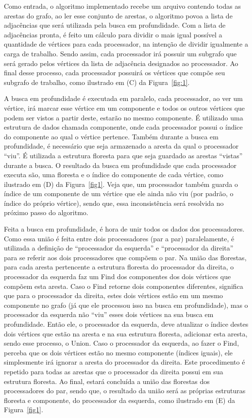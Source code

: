 \documentclass[12pt]{article}
\begin{document}
Como entrada, o algoritmo implementado recebe um arquivo contendo todas as arestas do grafo, ao ler esse conjunto de arestas, o algoritmo povoa a lista de adjacências que será utilizada pela busca em profundidade. Com a lista de adjacências pronta, é feito um cálculo para dividir o mais igual possível a quantidade de vértices para cada processador, na intenção de dividir igualmente a carga de trabalho. Sendo assim, cada processador irá possuir um subgrafo que será gerado pelos vértices da lista de adjacência designados ao processador. Ao final desse processo, cada processador possuirá os vértices que compõe seu subgrafo de trabalho, como ilustrado em (C) da Figura~\ref{fig:1}.

A busca em profundidade é executada em paralelo, cada processador, ao ver um vértice, irá marcar esse vértice em um componente e todos os outros vértices que podem ser vistos a partir deste, estarão no mesmo componente. É utilizado uma estrutura de dados chamada componente, onde cada processador possui o índice do componente ao qual o vértice pertence. Também durante a busca em profundidade, é necessário que seja armazenado a aresta da qual o processador “viu”. É utilizada a estrutura floresta para que seja guardado as arestas “vistas” durante a busca. O resultado da busca em profundidade que cada processador executa são, uma floresta e o índice do componente de cada vértice, como ilustrado em (D) da Figura~\ref{fig1}. Veja que, um processador também guarda o índice de um componente de um vértice que ele ainda não viu (por padrão, o índice do próprio vértice), sendo que, essa inconsistência será resolvida no próximo passo do algoritmo.

Feita a busca em profundidade, é hora de unir todos os dados dos processadores. Como essa união é feita entre dois processadores (par a par) paralelamente, é utilizada a definição de “processador da esquerda” e “processador da direita” para se referir aos dois processadores que compõem o par. Na união das florestas, para cada aresta pertencente a estrutura floresta do processador da direita, o processador da esquerda faz um Find dos componentes dos dois vértices que compõem esta aresta. Caso o Find retorne dois componentes diferentes, significa que para o processador da direita, estes dois vértices estão em um mesmo componente no grafo (já que ele processou isso na busca em profundidade), mas o processador da esquerda não “viu” esses dois vértices na sua busca em profundidade. Então ele, o processador da esquerda, deve atualizar o índice destes dois vértices que estão na aresta e na sua estrutura floresta, adicionar esta aresta, sendo esse processo, o Union. Caso o processador da esquerda, ao fazer o Find, perceba que os dois vértices estão no mesmo componente (índices iguais), ele simplesmente irá ignorar a aresta do processador da direita. Este procedimento é repetido para todas as arestas que o processador da direita possui em sua estrutura floresta. Ao final, estará concluída a união das florestas dos processadores do par, sendo que, o resultado da união será as próprias estruturas floresta e componente, do processador da esquerda, como ilustrado em (E) da Figura~\ref{fig1}.
\end{document}
